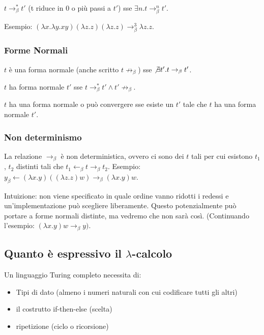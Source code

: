 \documentclass{article}
\begin{document}
\bigskip

$t\to_\beta^* t'$ ({\color{red}t riduce in 0 o più passi a $t'$}) sse $\exists n.t\to_\beta^n t'$.

\bigskip

Esempio: $(\lambda x. \lambda y.xy)(\lambda z.z)(\lambda z.z) \to_\beta^3 \lambda z.z$.

\subsubsection{Forme Normali}
$t$ {\color{red}è una forma normale} (anche scritto $t \not\to_\beta$) sse $\not\exists t'.t \to_\beta t'$.

\bigskip

\noindent $t$ {\color{red}ha forma normale} $t'$ sse $t\to_\beta^* t'\land t' \not\to_\beta$.

\bigskip

\noindent $t$ {\color{red}ha una forma normale} o {\color{red}può convergere} sse esiste un $t'$ tale che $t$ ha una forma normale $t'$.

\subsubsection{Non determinismo}
La relazione $\to_\beta$ è non deterministica, ovvero ci sono dei $t$ tali per cui esistono $t_1$, $t_2$ distinti tali che $t_1 \leftarrow_\beta t\to_\beta t_2$. Esempio: $y_\beta \leftarrow (\lambda x.y)((\lambda z.z)w) \to_\beta (\lambda x.y)w$.

\bigskip

Intuizione: non viene specificato in quale ordine vanno ridotti i
redessi e un'implementazione può scegliere liberamente. Questo potenzialmente può portare a forme normali distinte,
ma vedremo che non sarà così. (Continuando l'esempio: $(\lambda x.y)w \to_\beta y)$.

\subsection{Quanto è espressivo il $\lambda$-calcolo}
Un linguaggio Turing completo necessita di:
\begin{itemize}
    \item Tipi di dato (almeno i numeri naturali con cui codificare tutti gli altri)
    \item il costrutto if-then-else (scelta)
    \item ripetizione (ciclo o ricorsione)
\end{itemize}
\end{document}
